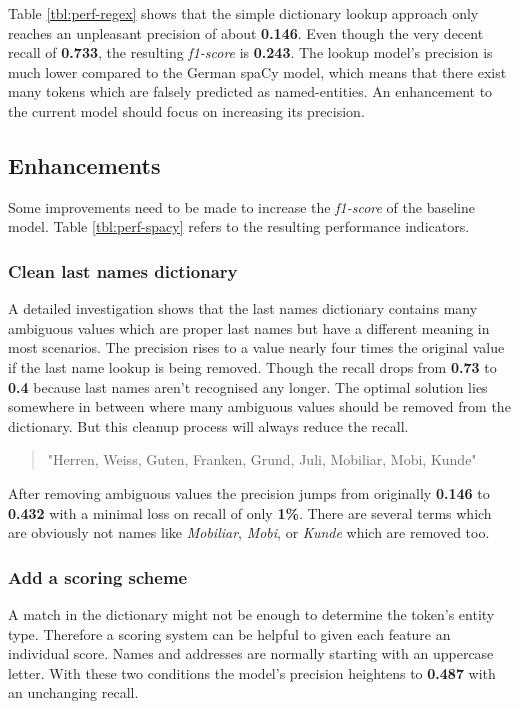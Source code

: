 Table \ref{tbl:perf-regex} shows that the simple dictionary lookup approach only reaches an unpleasant precision of about \textbf{0.146}. Even though the very
decent recall of \textbf{0.733}, the resulting \emph{f1-score} is \textbf{0.243}. The lookup model's precision is much lower compared to the German spaCy model,
which means that there exist many tokens which are falsely predicted as named-entities. An enhancement to the current model should focus on increasing its precision.

\subsection{Enhancements}

Some improvements need to be made to increase the \emph{f1-score} of the baseline model. Table \ref{tbl:perf-spacy} refers to the resulting performance indicators. 

\subsubsection{Clean last names dictionary}

A detailed investigation shows that the last names dictionary contains many ambiguous values which are proper last names but have a different meaning in most scenarios.
The precision rises to a value nearly four times the original value if the last name lookup is being removed. Though the recall drops from \textbf{0.73} to \textbf{0.4}
because last names aren't recognised any longer. The optimal solution lies somewhere in between where many ambiguous values should be removed from the dictionary. But
this cleanup process will always reduce the recall.

\begin{quote}
    "Herren, Weiss, Guten, Franken, Grund, Juli, Mobiliar, Mobi, Kunde"
\end{quote}

After removing ambiguous values the precision jumps from originally \textbf{0.146} to \textbf{0.432} with a minimal loss on recall of only \textbf{1\%}. There are
several terms which are obviously not names like \emph{Mobiliar}, \emph{Mobi}, or \emph{Kunde} which are removed too.

\subsubsection{Add a scoring scheme}

A match in the dictionary might not be enough to determine the token's entity type. Therefore a scoring system can be helpful to given each feature an individual score.
Names and addresses are normally starting with an uppercase letter. With these two conditions the model's precision heightens to \textbf{0.487} with an unchanging
recall. 

